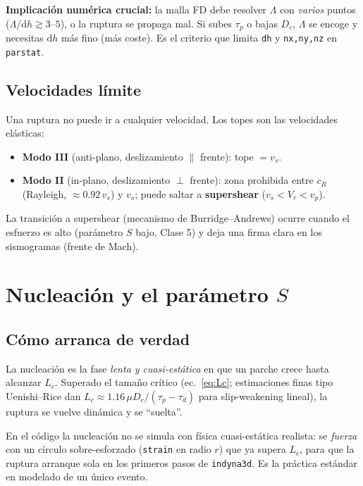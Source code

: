 \documentclass[11pt,a4paper]{article}
\newcommand{\dd}{\mathrm{d}}
\newcommand{\Dc}{D_c}
\newcommand{\taup}{\tau_p}
\newcommand{\taud}{\tau_d}
\begin{document}
\begin{codebox}
\textbf{Implicación numérica crucial:} la malla FD debe resolver $\Lambda$ con
\emph{varios} puntos ($\Lambda/\dd h \gtrsim 3$--$5$), o la ruptura se propaga
mal. Si subes $\taup$ o bajas $\Dc$, $\Lambda$ se encoge y necesitas $\dd h$ más
fino (más coste). Es el criterio que limita \texttt{dh} y \texttt{nx,ny,nz} en
\texttt{parstat}.
\end{codebox}

\subsection{Velocidades límite}
Una ruptura no puede ir a cualquier velocidad. Los topes son las velocidades
elásticas:
\begin{itemize}
  \item \textbf{Modo III} (anti-plano, deslizamiento $\parallel$ frente): tope
        $=v_s$.
  \item \textbf{Modo II} (in-plano, deslizamiento $\perp$ frente): zona
        prohibida entre $c_R$ (Rayleigh, $\approx0.92\,v_s$) y $v_s$; puede saltar
        a \textbf{supershear} ($v_s<V_r<v_p$).
\end{itemize}
La transición a supershear (mecanismo de Burridge--Andrews) ocurre cuando el
esfuerzo es alto (parámetro $S$ bajo, Clase 5) y deja una firma clara en los
sismogramas (frente de Mach).

\section{Nucleación y el parámetro $S$}

\subsection{Cómo arranca de verdad}
La nucleación es la fase \emph{lenta y cuasi-estática} en que un parche crece
hasta alcanzar $L_c$. Superado el tamaño crítico (ec.~\eqref{eq:Lc}; estimaciones
finas tipo Uenishi--Rice dan $L_c\approx1.16\,\mu\Dc/(\taup-\taud)$ para
slip-weakening lineal), la ruptura se vuelve dinámica y se ``suelta''.

\begin{codebox}
En el código la nucleación no se simula con física cuasi-estática realista: se
\emph{fuerza} con un círculo sobre-esforzado (\texttt{strain} en radio $r$) que
ya supera $L_c$, para que la ruptura arranque sola en los primeros pasos de
\texttt{indyna3d}. Es la práctica estándar en modelado de un único evento.
\end{codebox}
\end{document}
